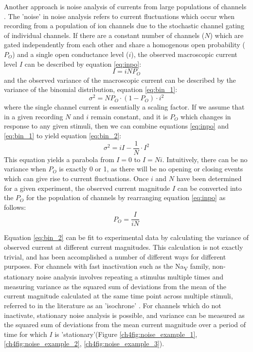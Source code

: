 Another approach is noise analysis of currents from large populations of channels \cite{heinemann_7_1992, alvarez_counting_2002}.
The 'noise' in noise analysis refers to current fluctuations which occur when recording from a population of ion channels due to the stochastic channel gating of individual channels.
If there are a constant number of channels ($N$) which are gated independently from each other and share a homogenous open probability ($P_O$) and a single open conductance level ($i$), the observed macroscopic current level $I$ can be described by equation \ref{eq:inpo}:
\begin{equation}\label{eq:inpo}
	I = iNP_O
\end{equation}
and the observed variance of the macroscopic current can be described by the variance of the binomial distribution, equation \ref{eq:bin_1}:
\begin{equation}\label{eq:bin_1}
	\sigma^2 = NP_O \cdot (1 - P_O) \cdot i^2
\end{equation}
where the single channel current is essentially a scaling factor.
If we assume that in a given recording $N$ and $i$ remain constant, and it is $P_O$ which changes in response to any given stimuli, then we can combine equations \ref{eq:inpo} and \ref{eq:bin_1} to yield equation \ref{eq:bin_2}:
\begin{equation}\label{eq:bin_2}
	\sigma^2 = iI - \frac{1}{N} \cdot I^2
\end{equation}
This equation yields a parabola from $I = 0$ to $I = Ni$.
Intuitively, there can be no variance when $P_O$ is exactly 0 or 1, as there will be no opening or closing events which can give rise to current fluctuations.
Once $i$ and $N$ have been determined for a given experiment, the observed current magnitude $I$ can be converted into the $P_O$ for the population of channels by rearranging equation \ref{eq:inpo} as follows:
\begin{equation}\label{eq:poin}
	P_O = \frac{I}{iN}
\end{equation}

Equation \ref{eq:bin_2} can be fit to experimental data by calculating the variance of observed current at different current magnitudes.
This calculation is not exactly trivial, and has been accomplished a number of different ways for different purposes.
For channels with fast inactivation such as the Na\textsubscript{V} family, non-stationary noise analysis involves repeating a stimulus multiple times and measuring variance as the squared sum of deviations from the mean of the current magnitude calculated at the same time point across multiple stimuli, referred to in the literature as an 'isochrone' \cite{sigworth_variance_1980}.
For channels which do not inactivate, stationary noise analysis is possible, and variance can be measured as the squared sum of deviations from the mean current magnitude over a period of time for which $I$ is 'stationary'(Figure \ref{ch4fig:noise_example_1}, \ref{ch4fig:noise_example_2}, \ref{ch4fig:noise_example_3}).

